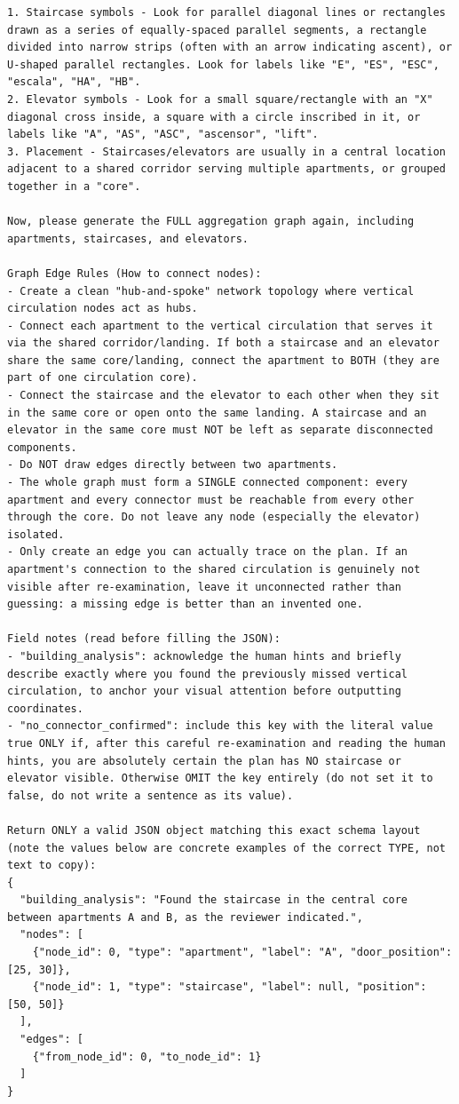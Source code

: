 \documentclass[12pt,a4paper,openright]{report}
\begin{document}
\begin{appendices}
\begin{lstlisting}[style=prompt]
1. Staircase symbols - Look for parallel diagonal lines or rectangles drawn as a series of equally-spaced parallel segments, a rectangle divided into narrow strips (often with an arrow indicating ascent), or U-shaped parallel rectangles. Look for labels like "E", "ES", "ESC", "escala", "HA", "HB".
2. Elevator symbols - Look for a small square/rectangle with an "X" diagonal cross inside, a square with a circle inscribed in it, or labels like "A", "AS", "ASC", "ascensor", "lift".
3. Placement - Staircases/elevators are usually in a central location adjacent to a shared corridor serving multiple apartments, or grouped together in a "core".

Now, please generate the FULL aggregation graph again, including apartments, staircases, and elevators.

Graph Edge Rules (How to connect nodes):
- Create a clean "hub-and-spoke" network topology where vertical circulation nodes act as hubs.
- Connect each apartment to the vertical circulation that serves it via the shared corridor/landing. If both a staircase and an elevator share the same core/landing, connect the apartment to BOTH (they are part of one circulation core).
- Connect the staircase and the elevator to each other when they sit in the same core or open onto the same landing. A staircase and an elevator in the same core must NOT be left as separate disconnected components.
- Do NOT draw edges directly between two apartments.
- The whole graph must form a SINGLE connected component: every apartment and every connector must be reachable from every other through the core. Do not leave any node (especially the elevator) isolated.
- Only create an edge you can actually trace on the plan. If an apartment's connection to the shared circulation is genuinely not visible after re-examination, leave it unconnected rather than guessing: a missing edge is better than an invented one.

Field notes (read before filling the JSON):
- "building_analysis": acknowledge the human hints and briefly describe exactly where you found the previously missed vertical circulation, to anchor your visual attention before outputting coordinates.
- "no_connector_confirmed": include this key with the literal value true ONLY if, after this careful re-examination and reading the human hints, you are absolutely certain the plan has NO staircase or elevator visible. Otherwise OMIT the key entirely (do not set it to false, do not write a sentence as its value).

Return ONLY a valid JSON object matching this exact schema layout (note the values below are concrete examples of the correct TYPE, not text to copy):
{
  "building_analysis": "Found the staircase in the central core between apartments A and B, as the reviewer indicated.",
  "nodes": [
    {"node_id": 0, "type": "apartment", "label": "A", "door_position": [25, 30]},
    {"node_id": 1, "type": "staircase", "label": null, "position": [50, 50]}
  ],
  "edges": [
    {"from_node_id": 0, "to_node_id": 1}
  ]
}


\end{lstlisting}
\end{appendices}
\end{document}
